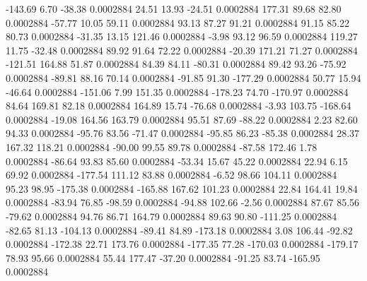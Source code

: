      -143.69        6.70      -38.38     0.0002884
       24.51       13.93      -24.51     0.0002884
      177.31       89.68       82.80     0.0002884
      -57.77       10.05       59.11     0.0002884
       93.13       87.27       91.21     0.0002884
       91.15       85.22       80.73     0.0002884
      -31.35       13.15      121.46     0.0002884
       -3.98       93.12       96.59     0.0002884
      119.27       11.75      -32.48     0.0002884
       89.92       91.64       72.22     0.0002884
      -20.39      171.21       71.27     0.0002884
     -121.51      164.88       51.87     0.0002884
       84.39       84.11      -80.31     0.0002884
       89.42       93.26      -75.92     0.0002884
      -89.81       88.16       70.14     0.0002884
      -91.85       91.30     -177.29     0.0002884
       50.77       15.94      -46.64     0.0002884
     -151.06        7.99      151.35     0.0002884
     -178.23       74.70     -170.97     0.0002884
       84.64      169.81       82.18     0.0002884
      164.89       15.74      -76.68     0.0002884
       -3.93      103.75     -168.64     0.0002884
      -19.08      164.56      163.79     0.0002884
       95.51       87.69      -88.22     0.0002884
        2.23       82.60       94.33     0.0002884
      -95.76       83.56      -71.47     0.0002884
      -95.85       86.23      -85.38     0.0002884
       28.37      167.32      118.21     0.0002884
      -90.00       99.55       89.78     0.0002884
      -87.58      172.46        1.78     0.0002884
      -86.64       93.83       85.60     0.0002884
      -53.34       15.67       45.22     0.0002884
       22.94        6.15       69.92     0.0002884
     -177.54      111.12       83.88     0.0002884
       -6.52       98.66      104.11     0.0002884
       95.23       98.95     -175.38     0.0002884
     -165.88      167.62      101.23     0.0002884
       22.84      164.41       19.84     0.0002884
      -83.94       76.85      -98.59     0.0002884
      -94.88      102.66       -2.56     0.0002884
       87.67       85.56      -79.62     0.0002884
       94.76       86.71      164.79     0.0002884
       89.63       90.80     -111.25     0.0002884
      -82.65       81.13     -104.13     0.0002884
      -89.41       84.89     -173.18     0.0002884
        3.08      106.44      -92.82     0.0002884
     -172.38       22.71      173.76     0.0002884
     -177.35       77.28     -170.03     0.0002884
     -179.17       78.93       95.66     0.0002884
       55.44      177.47      -37.20     0.0002884
      -91.25       83.74     -165.95     0.0002884
